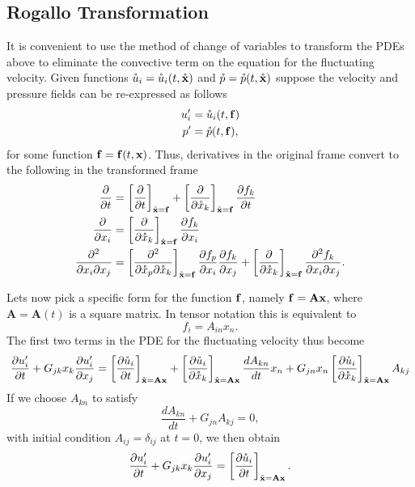 \documentclass[oneside,a4paper,11pt]{report}
\newcommand{\pfluc}{p'}
\newcommand{\ufluc}{u'}
\begin{document}
\subsection{Rogallo Transformation}
It is convenient to use the method of change of variables to transform the PDEs above to eliminate the convective term on the equation for the fluctuating velocity. Given functions $\mathring{u}_i = \mathring{u}_i(t,\mathring{\mathbf{x}})$ and $\mathring{p} = \mathring{p}(t,\mathring{\mathbf{x}})$ suppose the velocity and pressure fields can be re-expressed as follows
\begin{align}
\ufluc_i &= \urog_i(t,\fvec) \\
\pfluc &= \prog(t,\fvec),
\end{align}
for some function $\mathbf{f} = \mathbf{f}(t,\mathbf{x})$. Thus, derivatives in the original frame convert to the following in the transformed frame
\begin{align}
    \frac{\partial }{\partial t} &= \left [ \frac{\partial }{\partial t } \right ]_{\mathring{\mathbf{x}} = \mathbf{f}} + \left [ \frac{\partial }{\partial \mathring{x}_k}\right ]_{\mathring{\mathbf{x}} = \mathbf{f}} \frac{\partial f_k }{\partial t} \\
    \frac{\partial }{\partial x_i} &= \left [ \frac{\partial }{\partial \mathring{x}_k} \right ]_{\mathring{\mathbf{x}} = \mathbf{f}} \frac{\partial f_k}{\partial x_i} \\
    \frac{\partial^2 }{\partial x_i \partial x_j} &= \left [ \frac{\partial^2 }{\partial \mathring{x}_p \partial \mathring{x}_k} \right ]_{\mathring{\mathbf{x}} = \mathbf{f}} \frac{\partial f_p}{\partial x_i} \frac{\partial f_k}{\partial x_j} + \left [ \frac{\partial  }{\partial \mathring{x}_k} \right]_{\mathring{\mathbf{x}} = \mathbf{f} } \frac{\partial^2 f_k }{\partial x_i \partial x_j} .
\end{align}

Lets now pick a specific form for the function $\mathbf{f}$, namely $\mathbf{f} = \mathbf{A}\mathbf{x}$, where $\mathbf{A} = \mathbf{A}(t)$ is a square matrix. In tensor notation this is equivalent to
\begin{equation}
f_i = A_{in} x_n.
\end{equation}
The first two terms in the PDE for the fluctuating velocity thus become
\begin{equation}
\frac{\partial \ufluc_i}{\partial t} + G_{jk}x_k\frac{\partial \ufluc_i }{\partial x_j} = \left [ \frac{\partial \urog_i }{\partial t } \right ]_{\xrogvec = \mathbf{A}\xvec} + \left [ \frac{\partial \urog_i }{\partial \xrog_k}\right ]_{\xrogvec = \mathbf{A} \xvec} \frac{d A_{kn} }{d t} x_n + G_{jn}x_n \left [ \frac{\partial \urog_i }{\partial \xrog_k} \right ]_{\xrogvec = \mathbf{A} \xvec} A_{kj}
\end{equation}
If we choose $A_{kn}$ to satisfy
\begin{equation}
\label{rogallo_trans}
\frac{d A_{kn}}{dt} + G_{jn}A_{kj} = 0,
\end{equation}
with initial condition $A_{ij} = \delta_{ij}$ at $t = 0$, we then obtain 
\begin{equation}
\frac{\partial \ufluc_i }{\partial t} + G_{jk} x_k \frac{\partial \ufluc_i}{\partial x_j} = \left [ \frac{\partial \urog_i }{\partial t } \right ]_{\xrogvec = \mathbf{A} \xvec}.
\end{equation}
\end{document}

